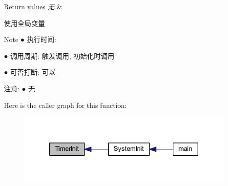 \begin{DoxyRetVals}{\-Return values}
{\em 无} & \\
\hline
\end{DoxyRetVals}
\begin{DoxyParagraph}{使用全局变量 }

\end{DoxyParagraph}
\begin{DoxyNote}{\-Note}
● 执行时间\-: \par
 ● 调用周期\-: 触发调用, 初始化时调用 \par
 ● 可否打断\-: 可以 \par

\end{DoxyNote}
\begin{DoxyParagraph}{注意\-:}
● 无 \par
 
\end{DoxyParagraph}


\-Here is the caller graph for this function\-:\nopagebreak
\begin{figure}[H]
\begin{center}
\leavevmode
\includegraphics[width=308pt]{group___t_i_m_e_r_ga5499adb17edb227885abaccd47631df4_icgraph}
\end{center}
\end{figure}


